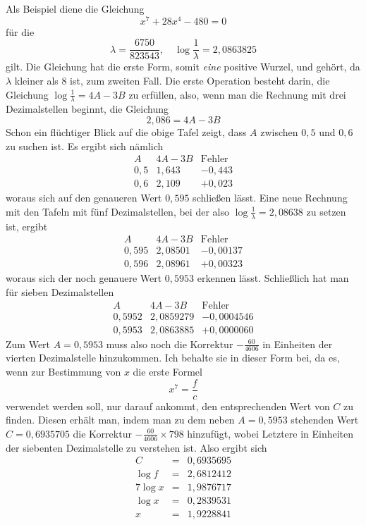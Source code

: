 Als Beispiel diene die Gleichung
\[
x^7+28x^4-480=0
\]
für die
\[
\lambda=\frac{6750}{823543},\quad \log\frac{1}{\lambda}=2{,}0863825
\]
gilt. Die Gleichung hat die erste Form, somit \textit{eine} positive Wurzel, und gehört, da $\lambda$ kleiner als $8$ ist, zum zweiten Fall. Die erste Operation besteht darin, die Gleichung $\log\frac{1}{\lambda}=4A-3B$ zu erfüllen, also, wenn man die Rechnung mit drei Dezimalstellen beginnt, die Gleichung
\[
2{,}086=4A-3B
\]
Schon ein flüchtiger Blick auf die obige Tafel zeigt, dass $A$ zwischen $0{,}5$ und $0{,}6$ zu suchen ist. Es ergibt sich nämlich
\[
\begin{array}{c|c|c}
A&4A-3B&\mbox{Fehler}\\\hline
0{,}5&1{,}643&-0{,}443\\
0{,}6&2{,}109&+0{,}023
\end{array}
\]
woraus sich auf den genaueren Wert $0{,}595$ schließen lässt. Eine neue Rechnung mit den Tafeln mit fünf Dezimalstellen, bei der also $\log\frac{1}{\lambda}=2{,}08638$ zu setzen ist, ergibt
\[
\begin{array}{c|c|c}
A&4A-3B&\mbox{Fehler}\\\hline
0{,}595&2{,}08501&-0{,}00137\\
0{,}596&2{,}08961&+0{,}00323
\end{array}
\]
woraus sich der noch genauere Wert $0{,}5953$ erkennen lässt. Schließlich hat man für sieben Dezimalstellen
\[
\begin{array}{c|c|c}
A&4A-3B&\mbox{Fehler}\\\hline
0{,}5952&2{,}0859279&-0{,}0004546\\
0{,}5953&2{,}0863885&+0{,}0000060
\end{array}
\]
Zum Wert $A=0{,}5953$ muss also noch die Korrektur $-\frac{60}{4606}$ in Einheiten der vierten Dezimalstelle hinzukommen. Ich behalte sie in dieser Form bei, da es, wenn zur Bestimmung von $x$ die erste Formel
\[
x^{7}=\frac{f}{c}
\]
verwendet werden soll, nur darauf ankommt, den entsprechenden Wert von $C$ zu finden. Diesen erhält man, indem man zu dem neben $A=0{,}5953$ stehenden Wert $C=0{,}6935705$ die Korrektur $-\frac{60}{4606}\times798$ hinzufügt, wobei Letztere in Einheiten der siebenten Dezimalstelle zu verstehen ist. Also ergibt sich
\[
\begin{array}{rcl}
C&=&0{,}6935695\\
\log f&=&2{,}6812412\\ \hline
7\log x&=&1{,}9876717\\
\log x&=&0{,}2839531\\
x&=&1{,}9228841
\end{array}
\]

